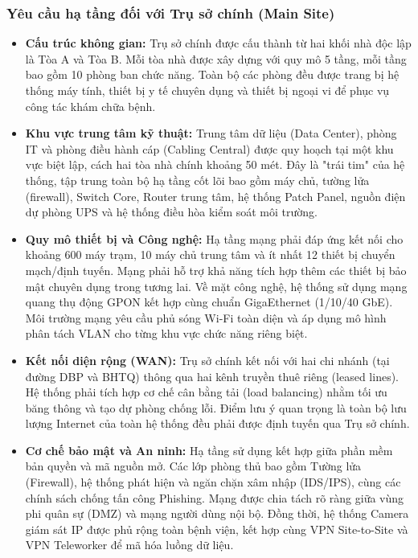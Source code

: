 \subsubsection{Yêu cầu hạ tầng đối với Trụ sở chính (Main Site)}
\begin{itemize}
    \item \textbf{Cấu trúc không gian:} Trụ sở chính được cấu thành từ hai khối nhà độc lập là Tòa A và Tòa B. Mỗi tòa nhà được xây dựng với quy mô 5 tầng, mỗi tầng bao gồm 10 phòng ban chức năng. Toàn bộ các phòng đều được trang bị hệ thống máy tính, thiết bị y tế chuyên dụng và thiết bị ngoại vi để phục vụ công tác khám chữa bệnh.
    \item \textbf{Khu vực trung tâm kỹ thuật:} Trung tâm dữ liệu (Data Center), phòng IT và phòng điều hành cáp (Cabling Central) được quy hoạch tại một khu vực biệt lập, cách hai tòa nhà chính khoảng 50 mét. Đây là "trái tim" của hệ thống, tập trung toàn bộ hạ tầng cốt lõi bao gồm máy chủ, tường lửa (firewall), Switch Core, Router trung tâm, hệ thống Patch Panel, nguồn điện dự phòng UPS và hệ thống điều hòa kiểm soát môi trường.
    \item \textbf{Quy mô thiết bị và Công nghệ:} Hạ tầng mạng phải đáp ứng kết nối cho khoảng 600 máy trạm, 10 máy chủ trung tâm và ít nhất 12 thiết bị chuyển mạch/định tuyến. Mạng phải hỗ trợ khả năng tích hợp thêm các thiết bị bảo mật chuyên dụng trong tương lai. Về mặt công nghệ, hệ thống sử dụng mạng quang thụ động GPON kết hợp cùng chuẩn GigaEthernet (1/10/40 GbE). Môi trường mạng yêu cầu phủ sóng Wi-Fi toàn diện và áp dụng mô hình phân tách VLAN cho từng khu vực chức năng riêng biệt.
    \item \textbf{Kết nối diện rộng (WAN):} Trụ sở chính kết nối với hai chi nhánh (tại đường DBP và BHTQ) thông qua hai kênh truyền thuê riêng (leased lines). Hệ thống phải tích hợp cơ chế cân bằng tải (load balancing) nhằm tối ưu băng thông và tạo dự phòng chống lỗi. Điểm lưu ý quan trọng là toàn bộ lưu lượng Internet của toàn hệ thống đều phải được định tuyến qua Trụ sở chính.
    \item \textbf{Cơ chế bảo mật và An ninh:} Hạ tầng sử dụng kết hợp giữa phần mềm bản quyền và mã nguồn mở. Các lớp phòng thủ bao gồm Tường lửa (Firewall), hệ thống phát hiện và ngăn chặn xâm nhập (IDS/IPS), cùng các chính sách chống tấn công Phishing. Mạng được chia tách rõ ràng giữa vùng phi quân sự (DMZ) và mạng người dùng nội bộ. Đồng thời, hệ thống Camera giám sát IP được phủ rộng toàn bệnh viện, kết hợp cùng VPN Site-to-Site và VPN Teleworker để mã hóa luồng dữ liệu.
\end{itemize}

